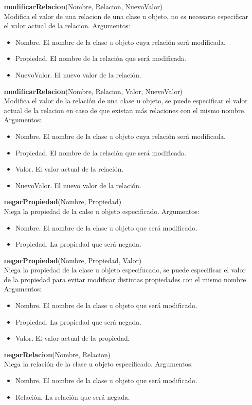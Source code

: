 \documentclass[11pt]{article}
\newcommand{\comando}[2]{
    \textbf{#1}(#2)\\
}
\newenvironment{args}{
    \newline
    Argumentos:
    \begin{itemize}
}{
    \end{itemize}
    \bigskip
}
\begin{document}
\comando{modificarRelacion}{Nombre, Relacion, NuevoValor}
Modifica el valor de una relacion de una clase u objeto, no es necesario especificar el valor actual de la relacion.
\begin{args}
\item Nombre. El nombre de la clase u objeto cuya relación será modificada.
\item Propiedad. El nombre de la relación que será modificada.
\item NuevoValor. El nuevo valor de la relación.
\end{args}

\comando{modificarRelacion}{Nombre, Relacion, Valor, NuevoValor}
Modifica el valor de la relación de una clase u objeto, se puede especificar el valor actual de la relacion en caso de que existan más relaciones con el mismo nombre.
\begin{args}
\item Nombre. El nombre de la clase u objeto cuya relación será modificada.
\item Propiedad. El nombre de la relación que será modificada.
\item Valor. El valor actual de la relación.
\item NuevoValor. El nuevo valor de la relación.
\end{args}

\comando{negarPropiedad}{Nombre, Propiedad}
Niega la propiedad de la calse u objeto especificado.
\begin{args}
\item Nombre. El nombre de la clase u objeto que será modificado.
\item Propiedad. La propiedad que será negada.
\end{args}

\comando{negarPropiedad}{Nombre, Propiedad, Valor}
Niega la propiedad de la clase u objeto especifucado, se puede especificar el valor de la propiedad para evitar modificar distintas propiedades con el mismo nombre.
\begin{args}
\item Nombre. El nombre de la clase u objeto que será modificado.
\item Propiedad. La propiedad que será negada.
\item Valor. El valor actual de la propiedad.
\end{args}

\comando{negarRelacion}{Nombre, Relacion}
Niega la relación de la clase u objeto especificado. 
\begin{args}
\item Nombre. El nombre de la clase u objeto que será modificado.
\item Relación. La relación que será negada.
\end{args}
\end{document}
